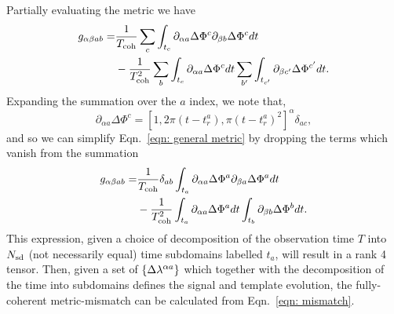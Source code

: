 \documentclass[../full_thesis/full_thesis.tex]{subfiles}
\begin{document}
Partially evaluating the metric we have
\begin{align}
\begin{split}
g_{\alpha\beta ab} = &  \frac{1}{T_{\mathrm{coh}}}\sum_{c} \int_{t_{c}}
                        \partial_{\alpha a}\Delta \Phi^{c}
                        \partial_{\beta b}\Delta \Phi^{c}  dt\\
 & -
\frac{1}{T_{\mathrm{coh}}^{2}}
\sum_{b} \int_{t_{c}}\partial_{\alpha a}\Delta \Phi^{c} dt
\sum_{b'} \int_{t_{c'}}\partial_{\beta c'}\Delta \Phi^{c'} dt.
\end{split}
\label{eqn: general metric}
\end{align}
Expanding the summation over the $a$ index, we note that,
\begin{equation}
 \partial_{\alpha a}\Delta \Phi^{c}  = \left[1, 2\pi (t - t_{r}^{a}),
                                           \pi (t - t_{r}^{a})^{2}
                                           \right]^{\alpha} \delta_{ac},
\label{eqn: NEterm}
\end{equation}
and so we can simplify Eqn.~\eqref{eqn: general metric} by dropping the terms
which vanish from the summation
\begin{align}
\begin{split}
g_{\alpha\beta ab} =& \frac{1}{T_{\mathrm{coh}}}\delta_{ab} \int_{t_{a}}
                      \partial_{\alpha a}\Delta \Phi^{a}
                      \partial_{\beta a}\Delta \Phi^{a} dt \\
 & - \frac{1}{T_{\mathrm{coh}}^{2}} \int_{t_{a}} \partial_{\alpha a}\Delta \Phi^{a} dt
  \int_{t_{b}} \partial_{\beta b}\Delta \Phi^{b} dt.
\end{split}
\label{eqn: metric}
\end{align}
This expression, given a choice of decomposition of the observation time $T$ into
$N_{\textrm{sd}}$ (not necessarily equal) time subdomains labelled $t_{a}$, will result in a rank 4
tensor. Then, given a set of $\{\Delta\lambda^{\alpha a}\}$ which together with the decomposition
of the time into subdomains defines the signal and template evolution, the
fully-coherent metric-mismatch can be calculated from Eqn.~\eqref{eqn: mismatch}.
\end{document}
